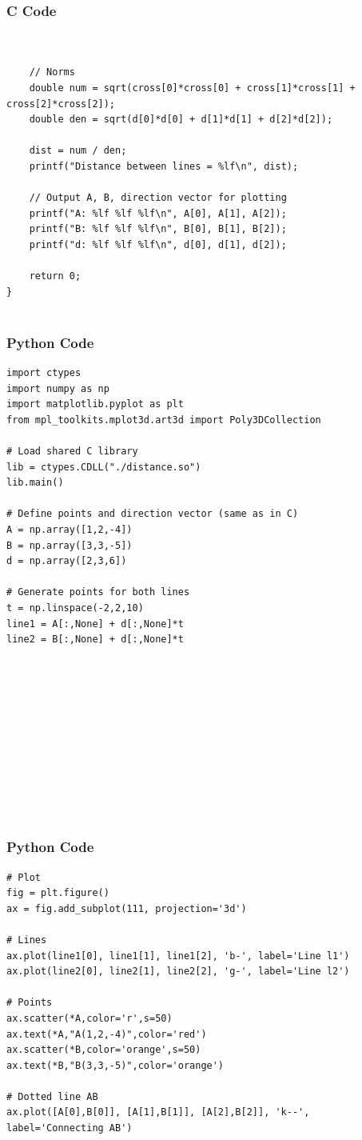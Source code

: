 \documentclass{beamer}
\begin{document}
\begin{frame}[fragile]
    \frametitle{C Code  }

    \begin{lstlisting}


    // Norms
    double num = sqrt(cross[0]*cross[0] + cross[1]*cross[1] + cross[2]*cross[2]);
    double den = sqrt(d[0]*d[0] + d[1]*d[1] + d[2]*d[2]);

    dist = num / den;
    printf("Distance between lines = %lf\n", dist);

    // Output A, B, direction vector for plotting
    printf("A: %lf %lf %lf\n", A[0], A[1], A[2]);
    printf("B: %lf %lf %lf\n", B[0], B[1], B[2]);
    printf("d: %lf %lf %lf\n", d[0], d[1], d[2]);

    return 0;
}


    \end{lstlisting}
\end{frame}


\begin{frame}[fragile]
    \frametitle{Python Code}
    \begin{lstlisting}
import ctypes
import numpy as np
import matplotlib.pyplot as plt
from mpl_toolkits.mplot3d.art3d import Poly3DCollection

# Load shared C library
lib = ctypes.CDLL("./distance.so")
lib.main()

# Define points and direction vector (same as in C)
A = np.array([1,2,-4])
B = np.array([3,3,-5])
d = np.array([2,3,6])

# Generate points for both lines
t = np.linspace(-2,2,10)
line1 = A[:,None] + d[:,None]*t
line2 = B[:,None] + d[:,None]*t












    \end{lstlisting}
\end{frame}

\begin{frame}[fragile]
    \frametitle{Python Code}
    \begin{lstlisting}
# Plot
fig = plt.figure()
ax = fig.add_subplot(111, projection='3d')

# Lines
ax.plot(line1[0], line1[1], line1[2], 'b-', label='Line l1')
ax.plot(line2[0], line2[1], line2[2], 'g-', label='Line l2')

# Points
ax.scatter(*A,color='r',s=50)
ax.text(*A,"A(1,2,-4)",color='red')
ax.scatter(*B,color='orange',s=50)
ax.text(*B,"B(3,3,-5)",color='orange')

# Dotted line AB
ax.plot([A[0],B[0]], [A[1],B[1]], [A[2],B[2]], 'k--', label='Connecting AB')













    \end{lstlisting}
\end{frame}
\end{document}
